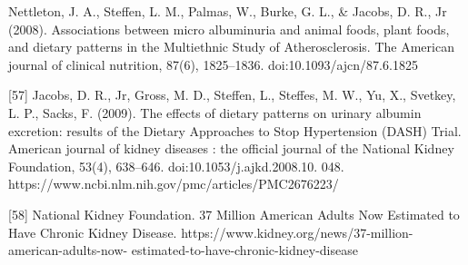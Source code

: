 \begin{flushleft}
[56]  Nettleton, J. A., Steffen, L. M., Palmas, W., Burke, G. L., \& Jacobs, D. R., Jr (2008). Associations between micro albuminuria and animal foods, plant foods, and dietary patterns in the Multiethnic Study of Atherosclerosis. The American journal of clinical nutrition, 87(6), 1825–1836. doi:10.1093/ajcn/87.6.1825

[57] 	Jacobs, D. R., Jr, Gross, M. D., Steffen, L., Steffes, M. W., Yu, X., Svetkey, L. P.,  Sacks, F. (2009). The effects of dietary patterns on urinary albumin excretion: results of the Dietary Approaches to Stop Hypertension (DASH) Trial. American journal of kidney diseases : the official journal of the National Kidney Foundation, 53(4), 638–646. doi:10.1053/j.ajkd.2008.10. 048. https://www.ncbi.nlm.nih.gov/pmc/articles/PMC2676223/

[58] National Kidney Foundation. 37 Million American Adults Now Estimated to Have 
Chronic Kidney Disease. https://www.kidney.org/news/37-million-american-adults-now-
estimated-to-have-chronic-kidney-disease

\end{flushleft}